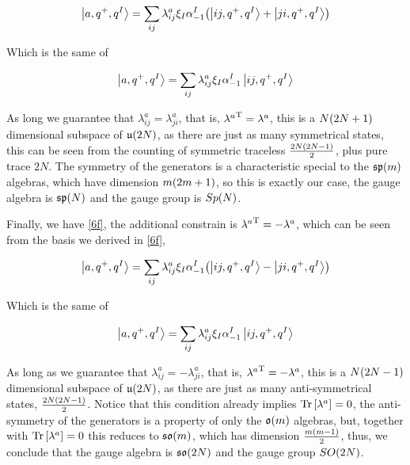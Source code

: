 \begin{align*}
    \ket{a,q^+,q^I}=\sum\limits_{ij}\lambda^{a}_{ij}\xi_I\alpha^I_{-1}\qty(\ket{ij,q^+,q^I}+\ket{ji,q^+,q^I})
\end{align*}

Which is the same of

\begin{align*}
    \ket{a,q^+,q^I}=\sum\limits_{ij}\lambda^{a}_{ij}\xi_I\alpha^I_{-1}\ket{ij,q^+,q^I}
\end{align*}

As long we guarantee that $\lambda^{a}_{ij}=\lambda^{a}_{ji}$, that is, ${\lambda^a}^{\textnormal{T}}=\lambda^a$, this is a $N\qty(2N+1)$ dimensional subspace of $\mathfrak u\qty(2N)$, 
as there are just as many symmetrical states, this can be seen from the counting of symmetric traceless $\frac{2N\qty(2N-1)}{2}$, plus pure trace $2N$. The symmetry of the generators is a 
characteristic special to the $\mathfrak {sp}\qty(m)$ algebras, which have dimension $m\qty(2m+1)$, so this is exactly our case, the gauge algebra is $\mathfrak{sp}\qty(N)$ and the gauge group is $Sp\qty(N)$. 

Finally, we have \ref{6f}, the additional constrain is ${\lambda^a}^{\textnormal{T}}=-\lambda^a$, which can be seen from the basis we derived in \ref{6f}, 

\begin{align*}
    \ket{a,q^+,q^I}=\sum\limits_{ij}\lambda^{a}_{ij}\xi_I\alpha^I_{-1}\qty(\ket{ij,q^+,q^I}-\ket{ji,q^+,q^I})
\end{align*}

Which is the same of

\begin{align*}
    \ket{a,q^+,q^I}=\sum\limits_{ij}\lambda^{a}_{ij}\xi_I\alpha^I_{-1}\ket{ij,q^+,q^I}
\end{align*}

As long as we guarantee that $\lambda^a_{ij}=-\lambda^a_{ji}$, that is, ${\lambda^a}^{\textnormal{T}}=-\lambda^a$, this is a $N\qty(2N-1)$ dimensional subspace of $\mathfrak u\qty(2N)$, as 
there are just as many anti-symmetrical states, $\frac{2N\qty(2N-1)}{2}$. Notice that this condition already implies $\Tr\qty[\lambda^a]=0$, the anti-symmetry of the generators is a property of 
only the $\mathfrak o\qty(m)$ algebras, but, together with $\Tr\qty[\lambda ^a]=0$ this reduces to $\mathfrak{so}\qty(m)$, which has dimension $\frac{m\qty(m-1)}{2}$, thus, we conclude that the gauge algebra is $\mathfrak {so}\qty(2N)$ and the gauge group $SO\qty(2N)$.